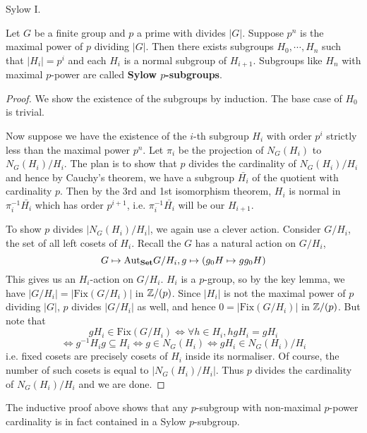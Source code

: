 \documentclass[../../book.tex]{subfiles}
\begin{document}
\begin{thm} Sylow I. 
    
    Let $G$ be a finite group and $p$ a prime with divides $|G|$. 
    Suppose $p^n$ is the maximal power of $p$ dividing $|G|$. 
    Then there exists subgroups $H_0, \cdots, H_n$ such that
    $|H_i| = p^i$ and each $H_i$ is a normal subgroup of $H_{i+1}$. 
    Subgroups like $H_n$ with maximal $p$-power are called 
    \textbf{Sylow $p$-subgroups}.
    
\end{thm}
\begin{proof}
    
    We show the existence of the subgroups by induction. 
    The base case of $H_0$ is trivial. 
    
    Now suppose we have the existence of the $i$-th subgroup $H_i$
    with order $p^i$ strictly less than the maximal power $p^n$. 
    Let $\pi_i$ be the projection of $N_G(H_i)$ to $N_G(H_i) / H_i$.
    The plan is to show that $p$ divides the cardinality of $N_G(H_i) / H_i$
    and hence by Cauchy's theorem, 
    we have a subgroup $\bar{H_i}$ of the quotient with cardinality $p$. 
    Then by the 3rd and 1st isomorphism theorem, 
    $H_i$ is normal in $\pi_i^{-1}\bar{H_i}$ which has order $p^{i+1}$,
    i.e. $\pi_i^{-1}\bar{H_i}$ will be our $H_{i+1}$. 
    
    To show $p$ divides $|N_G(H_i) / H_i|$, we again use a clever action.
    Consider $G / H_i$, the set of all left cosets of $H_i$.
    Recall the $G$ has a natural action on $G / H_i$, \[
        G \mapsto \mathrm{Aut}_{\mathbf{Set}}G / H_i, g \mapsto (g_0H \mapsto g g_0H)
    \]
    This gives us an $H_i$-action on $G / H_i$. 
    $H_i$ is a $p$-group, so by the key lemma,
    we have $|G / H_i| = |\mathrm{Fix}(G / H_i)|$ in $\mathbb{Z} / (p)$.
    Since $|H_i|$ is not the maximal power of $p$ dividing $|G|$,
    $p$ divides $|G / H_i|$ as well, 
    and hence $0 = |\mathrm{Fix}(G / H_i)|$ in $\mathbb{Z} / (p)$. 
    But note that \[
        gH_i \in \mathrm{Fix}(G / H_i) 
        \iff \forall h \in H_i, h gH_i = gH_i
    \]
    \[
        \iff g^{-1} H_i g \subseteq H_i
        \iff g \in N_G(H_i) 
        \iff gH_i \in N_G(H_i) / H_i
    \]
    i.e. fixed cosets are precisely cosets of $H_i$ inside its normaliser. 
    Of course, the number of such cosets is equal to $|N_G(H_i) / H_i|$.
    Thus $p$ divides the cardinality of $N_G(H_i) / H_i$ and we are done. 
\end{proof}

\begin{rmk}
    
    The inductive proof above shows that 
    any $p$-subgroup with non-maximal $p$-power cardinality
    is in fact contained in a Sylow $p$-subgroup. 
    
\end{rmk}
\end{document}
